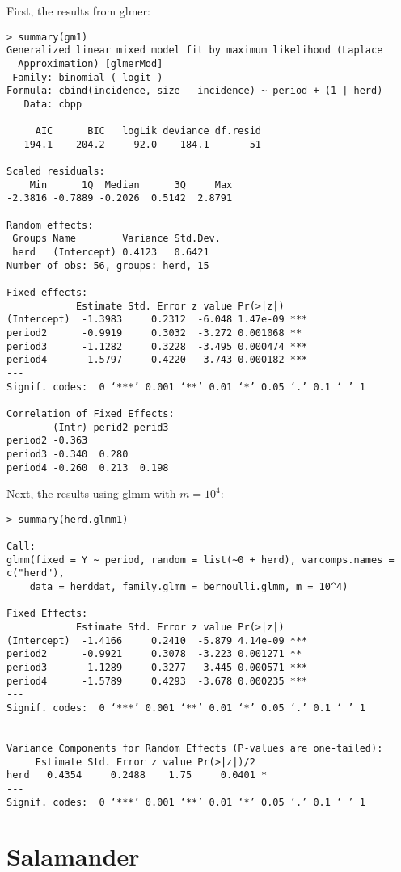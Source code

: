 \documentclass{article}
\begin{document}
First, the results from glmer:
\begin{verbatim}
> summary(gm1)
Generalized linear mixed model fit by maximum likelihood (Laplace
  Approximation) [glmerMod]
 Family: binomial ( logit )
Formula: cbind(incidence, size - incidence) ~ period + (1 | herd)
   Data: cbpp

     AIC      BIC   logLik deviance df.resid 
   194.1    204.2    -92.0    184.1       51 

Scaled residuals: 
    Min      1Q  Median      3Q     Max 
-2.3816 -0.7889 -0.2026  0.5142  2.8791 

Random effects:
 Groups Name        Variance Std.Dev.
 herd   (Intercept) 0.4123   0.6421  
Number of obs: 56, groups: herd, 15

Fixed effects:
            Estimate Std. Error z value Pr(>|z|)    
(Intercept)  -1.3983     0.2312  -6.048 1.47e-09 ***
period2      -0.9919     0.3032  -3.272 0.001068 ** 
period3      -1.1282     0.3228  -3.495 0.000474 ***
period4      -1.5797     0.4220  -3.743 0.000182 ***
---
Signif. codes:  0 ‘***’ 0.001 ‘**’ 0.01 ‘*’ 0.05 ‘.’ 0.1 ‘ ’ 1

Correlation of Fixed Effects:
        (Intr) perid2 perid3
period2 -0.363              
period3 -0.340  0.280       
period4 -0.260  0.213  0.198

\end{verbatim}

Next, the results using glmm with $m=10^4$:
\begin{verbatim}
> summary(herd.glmm1)

Call:
glmm(fixed = Y ~ period, random = list(~0 + herd), varcomps.names = c("herd"), 
    data = herddat, family.glmm = bernoulli.glmm, m = 10^4)

Fixed Effects:
            Estimate Std. Error z value Pr(>|z|)    
(Intercept)  -1.4166     0.2410  -5.879 4.14e-09 ***
period2      -0.9921     0.3078  -3.223 0.001271 ** 
period3      -1.1289     0.3277  -3.445 0.000571 ***
period4      -1.5789     0.4293  -3.678 0.000235 ***
---
Signif. codes:  0 ‘***’ 0.001 ‘**’ 0.01 ‘*’ 0.05 ‘.’ 0.1 ‘ ’ 1


Variance Components for Random Effects (P-values are one-tailed):
     Estimate Std. Error z value Pr(>|z|)/2  
herd   0.4354     0.2488    1.75     0.0401 *
---
Signif. codes:  0 ‘***’ 0.001 ‘**’ 0.01 ‘*’ 0.05 ‘.’ 0.1 ‘ ’ 1

\end{verbatim}


\section{Salamander}
\end{document}
